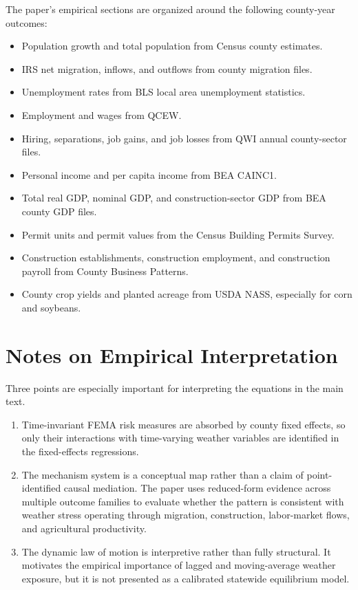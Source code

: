 \documentclass[12pt]{article}
\begin{document}
The paper's empirical sections are organized around the following county-year outcomes:
\begin{itemize}[leftmargin=1.2em]
\item Population growth and total population from Census county estimates.
\item IRS net migration, inflows, and outflows from county migration files.
\item Unemployment rates from BLS local area unemployment statistics.
\item Employment and wages from QCEW.
\item Hiring, separations, job gains, and job losses from QWI annual county-sector files.
\item Personal income and per capita income from BEA CAINC1.
\item Total real GDP, nominal GDP, and construction-sector GDP from BEA county GDP files.
\item Permit units and permit values from the Census Building Permits Survey.
\item Construction establishments, construction employment, and construction payroll from County Business Patterns.
\item County crop yields and planted acreage from USDA NASS, especially for corn and soybeans.
\end{itemize}

\section{Notes on Empirical Interpretation}

Three points are especially important for interpreting the equations in the main text.
\begin{enumerate}[leftmargin=1.4em]
\item Time-invariant FEMA risk measures are absorbed by county fixed effects, so only their interactions with time-varying weather variables are identified in the fixed-effects regressions.
\item The mechanism system is a conceptual map rather than a claim of point-identified causal mediation. The paper uses reduced-form evidence across multiple outcome families to evaluate whether the pattern is consistent with weather stress operating through migration, construction, labor-market flows, and agricultural productivity.
\item The dynamic law of motion is interpretive rather than fully structural. It motivates the empirical importance of lagged and moving-average weather exposure, but it is not presented as a calibrated statewide equilibrium model.
\end{enumerate}
\end{document}
